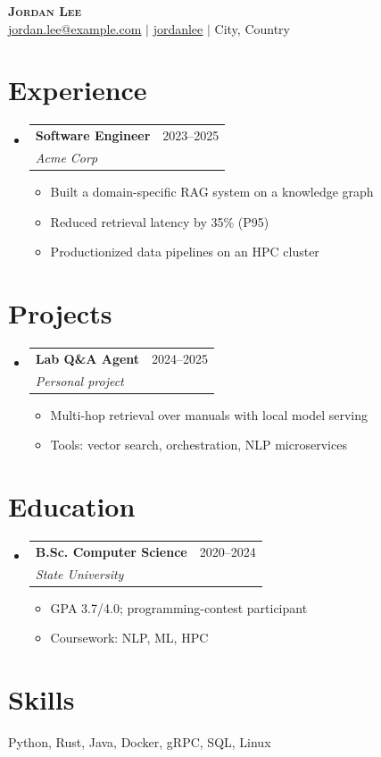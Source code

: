\documentclass[letterpaper,11pt]{article}
\makeatletter
\newcommand{\resumeItem}[1]{
  \item\small{
    {#1 \vspace{-2pt}}
  }
}
\newcommand{\resumeSubheading}[4]{
  \vspace{-2pt}\item
    \begin{tabular*}{0.97\linewidth}[t]{l@{\extracolsep{\fill}}r}
      \textbf{#1} & #2 \\
      \textit{\small#3} & \textit{\small #4} \\
    \end{tabular*}\vspace{-7pt}
}
\newcommand{\resumeSubHeadingListStart}{\begin{itemize}[leftmargin=0.15in, label={}]}
\newcommand{\resumeSubHeadingListEnd}{\end{itemize}}
\newcommand{\resumeItemListStart}{\begin{itemize}}
\newcommand{\resumeItemListEnd}{\end{itemize}\vspace{-5pt}}
\makeatother
\begin{document}
\begin{center}
    \textbf{\Huge \scshape Jordan Lee} \\ \vspace{1pt}
    \small \href{mailto:jordan.lee@example.com}{\underline{jordan.lee@example.com}} $|$ \href{https://github.com/jordanlee}{\underline{jordanlee}} $|$ City, Country
\end{center}

\section{Experience}
  \resumeSubHeadingListStart
    \resumeSubheading
      {Software Engineer}{2023–2025}
      {Acme Corp}{}
      \resumeItemListStart
        \resumeItem{Built a domain-specific RAG system on a knowledge graph}
        \resumeItem{Reduced retrieval latency by 35\% (P95)}
        \resumeItem{Productionized data pipelines on an HPC cluster}
      \resumeItemListEnd
  \resumeSubHeadingListEnd

\section{Projects}
  \resumeSubHeadingListStart
    \resumeSubheading
      {Lab Q\&A Agent}{2024–2025}
      {Personal project}{}
      \resumeItemListStart
        \resumeItem{Multi-hop retrieval over manuals with local model serving}
        \resumeItem{Tools: vector search, orchestration, NLP microservices}
      \resumeItemListEnd
  \resumeSubHeadingListEnd

\section{Education}
  \resumeSubHeadingListStart
    \resumeSubheading
      {B.Sc. Computer Science}{2020–2024}
      {State University}{}
      \resumeItemListStart
        \resumeItem{GPA 3.7/4.0; programming-contest participant}
        \resumeItem{Coursework: NLP, ML, HPC}
      \resumeItemListEnd
  \resumeSubHeadingListEnd

\section{Skills}
  \begin{itemize}[leftmargin=0.15in, label={}]
    \small{\item{Python, Rust, Java, Docker, gRPC, SQL, Linux}}
  \end{itemize}
\end{document}
